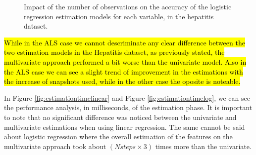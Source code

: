  \begin{figure}[h]
	\begin{subfigmatrix}{2}
  \end{subfigmatrix}
  \caption{Impact of the number of observations on the accuracy of the logistic regression estimation models for each variable, in the hepatitis dataset.}
  \label{fig:estimationlogh}
\end{figure}

\hl{While in the ALS case we cannot descriminate any clear difference between the two estimation models in the Hepatitis dataset, as previously stated, the multivariate approach performed a bit worse than the univariate model. Also in the ALS case we can see a slight trend of improvement in the estimations with the increase of snapshots used, while in the other case the oposite is noteable.}

In Figure \ref{fig:estimationtimelinear} and Figure \ref{fig:estimationtimelog}, we can see the performance analysis, in milliseconds, of the estimation
 phase. It is important to note that no significant difference was noticed between the univariate and multivariate estimations when using linear regression.
 The same cannot be said about logistic regression where the overall estimation of the features on the multivariate
approach took about $(N steps \times 3)$ times more than the univariate.

